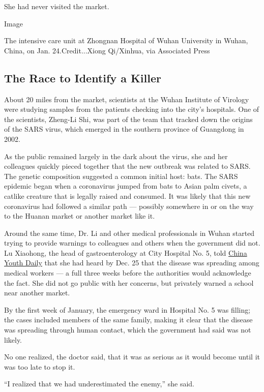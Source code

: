 She had never visited the market.

Image

The intensive care unit at Zhongnan Hospital of Wuhan University in
Wuhan, China, on Jan. 24.Credit...Xiong Qi/Xinhua, via Associated Press

\hypertarget{the-race-to-identify-a-killer}{%
\subsection{The Race to Identify a
Killer}\label{the-race-to-identify-a-killer}}

About 20 miles from the market, scientists at the Wuhan Institute of
Virology were studying samples from the patients checking into the
city's hospitals. One of the scientists, Zheng-Li Shi, was part of the
team that tracked down the origins of the SARS virus, which emerged in
the southern province of Guangdong in 2002.

As the public remained largely in the dark about the virus, she and her
colleagues quickly pieced together that the new outbreak was related to
SARS. The genetic composition suggested a common initial host: bats. The
SARS epidemic began when a coronavirus jumped from bats to Asian palm
civets, a catlike creature that is legally raised and consumed. It was
likely that this new coronavirus had followed a similar path ---
possibly somewhere in or on the way to the Huanan market or another
market like it.

Around the same time, Dr. Li and other medical professionals in Wuhan
started trying to provide warnings to colleagues and others when the
government did not. Lu Xiaohong, the head of gastroenterology at City
Hospital No. 5, told
\href{https://mp.weixin.qq.com/s/IzzCnz4Yr2jEIYZePiu_ow}{China Youth
Daily} that she had heard by Dec. 25 that the disease was spreading
among medical workers --- a full three weeks before the authorities
would acknowledge the fact. She did not go public with her concerns, but
privately warned a school near another market.

By the first week of January, the emergency ward in Hospital No. 5 was
filling; the cases included members of the same family, making it clear
that the disease was spreading through human contact, which the
government had said was not likely.

No one realized, the doctor said, that it was as serious as it would
become until it was too late to stop it.

``I realized that we had underestimated the enemy,'' she said.

